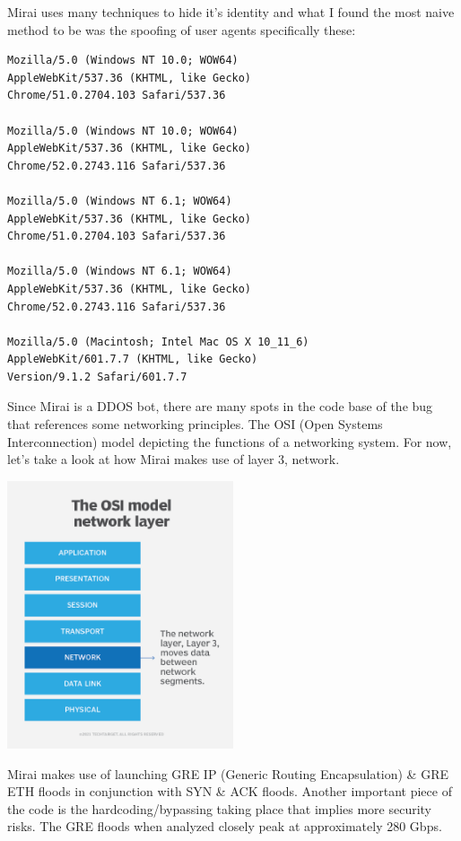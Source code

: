 \documentclass[12pt, letterpaper]{article}
\begin{document}
\begin{sloppypar}
\begin{flushleft}
\begin{lstlisting}
\end{lstlisting}
Mirai uses many techniques to hide it's identity and what I found the most
naive method to be was the spoofing of user agents specifically these:
\begin{verbatim}
Mozilla/5.0 (Windows NT 10.0; WOW64) 
AppleWebKit/537.36 (KHTML, like Gecko) 
Chrome/51.0.2704.103 Safari/537.36

Mozilla/5.0 (Windows NT 10.0; WOW64) 
AppleWebKit/537.36 (KHTML, like Gecko) 
Chrome/52.0.2743.116 Safari/537.36

Mozilla/5.0 (Windows NT 6.1; WOW64) 
AppleWebKit/537.36 (KHTML, like Gecko) 
Chrome/51.0.2704.103 Safari/537.36

Mozilla/5.0 (Windows NT 6.1; WOW64) 
AppleWebKit/537.36 (KHTML, like Gecko) 
Chrome/52.0.2743.116 Safari/537.36

Mozilla/5.0 (Macintosh; Intel Mac OS X 10_11_6) 
AppleWebKit/601.7.7 (KHTML, like Gecko) 
Version/9.1.2 Safari/601.7.7
\end{verbatim}


Since Mirai is a DDOS bot, there are many spots in the code base of the bug that 
references some networking principles. The OSI (Open Systems Interconnection) model 
depicting the functions of a networking system. For now, let's take a look at how
Mirai makes use of layer 3, network. 
\begin{center}
{\includegraphics[width=0.5\textwidth]{osi-networking.png}}
\end{center}

Mirai makes use of launching GRE IP (Generic Routing Encapsulation) \& GRE ETH floods
in conjunction with SYN \& ACK floods. Another important piece of the code is the 
hardcoding/bypassing taking place that implies more security risks. The GRE floods
when analyzed closely peak at approximately 280 Gbps.


\end{flushleft}
\end{sloppypar}
\end{document}
